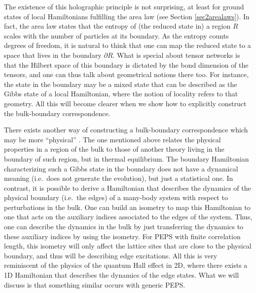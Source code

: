 \documentclass[rmp,aps,reprint,superscriptaddress,nobalancelastpage]{revtex4-1}
\begin{document}
The existence of this holographic principle is not surprising, at least for ground states of local Hamiltonians fulfilling the area law (see Section \ref{sec2arealaws}). In fact, the area law states that the entropy of (the reduced state in) a region $R$ scales with the number of particles at its boundary. As the entropy counts degrees of freedom, it is natural to think that one can map the reduced state to a space that lives in the boundary $\partial R$. What is special about tensor networks is that the Hilbert space of this boundary is dictated by the bond dimension of the tensors, and one can thus talk about geometrical notions there too. For instance, the state in the boundary may be a mixed state that can be described as the Gibbs state of a local Hamiltonian, where the notion of locality refers to that geometry. All this will become clearer when we show how to explicitly construct the bulk-boundary correspondence.

There exists another way of constructing a bulk-boundary correspondence which may be more ``physical'' \cite{yang:peps-edgetheories}. The one mentioned above relates the physical properties in a region of the bulk to those of another theory living in the boundary of such region, but in thermal equilibrium. The boundary Hamiltonian characterizing such a Gibbs state in the boundary does not have a dynamical meaning (i.e.\ does not generate the evolution), but just a statistical one. In contrast, it is possible to derive a Hamiltonian that describes the dynamics of the physical boundary (i.e.\ the edges) of a many-body system with respect to perturbations in the bulk. One can build an isometry to map this Hamiltonian to one that acts on the auxiliary indices associated to the edges of the system. Thus, one can describe the dynamics in the bulk by just transferring the dynamics to these auxiliary indices by using the isometry. For PEPS with finite correlation length, this isometry will only affect the lattice sites that are close to the physical boundary, and thus will be describing edge excitations. All this is very reminiscent of the physics of the quantum Hall effect in 2D, where there exists a 1D Hamiltonian that describes the dynamics of the edge states. What we will discuss is that something similar occurs with generic PEPS.
\end{document}
